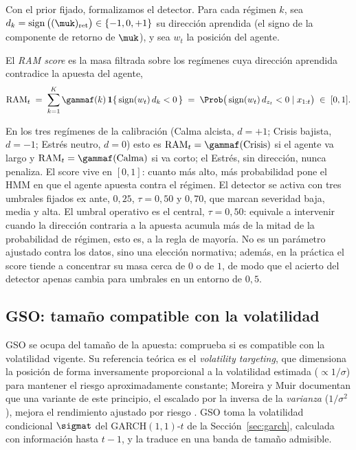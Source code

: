 Con el prior fijado, formalizamos el detector. Para cada régimen $k$, sea $d_k = \operatorname{sign}\big((\muk)_{\mathrm{ret}}\big) \in \{-1, 0, +1\}$ su dirección aprendida (el signo de la componente de retorno de $\muk$), y sea $w_t$ la posición del agente.

\begin{definicion}
\label{def:ram}
El \emph{RAM score} es la masa filtrada sobre los regímenes cuya dirección aprendida contradice la apuesta del agente,
\[
\mathrm{RAM}_t \;=\; \sum_{k=1}^{K} \gammaf(k)\, \mathbf{1}\{\, \operatorname{sign}(w_t)\, d_k < 0 \,\} \;=\; \Prob\big(\operatorname{sign}(w_t)\, d_{z_t} < 0 \mid x_{1:t}\big) \;\in\; [0,1].
\]
\end{definicion}

En los tres regímenes de la calibración (Calma alcista, $d=+1$; Crisis bajista, $d=-1$; Estrés neutro, $d=0$) esto es $\mathrm{RAM}_t = \gammaf(\text{Crisis})$ si el agente va largo y $\mathrm{RAM}_t = \gammaf(\text{Calma})$ si va corto; el Estrés, sin dirección, nunca penaliza. El score vive en $[0,1]$: cuanto más alto, más probabilidad pone el HMM en que el agente apuesta contra el régimen. El detector se activa con tres umbrales fijados ex ante, $0{,}25$, $\tau = 0{,}50$ y $0{,}70$, que marcan severidad baja, media y alta. El umbral operativo es el central, $\tau = 0{,}50$: equivale a intervenir cuando la dirección contraria a la apuesta acumula más de la mitad de la probabilidad de régimen, esto es, a la regla de mayoría. No es un parámetro ajustado contra los datos, sino una elección normativa; además, en la práctica el score tiende a concentrar su masa cerca de $0$ o de $1$, de modo que el acierto del detector apenas cambia para umbrales en un entorno de $0{,}5$.

\subsection{GSO: tamaño compatible con la volatilidad}
\label{sec:strata-gso}

GSO se ocupa del tamaño de la apuesta: comprueba si es compatible con la volatilidad vigente. Su referencia teórica es el \emph{volatility targeting}, que dimensiona la posición de forma inversamente proporcional a la volatilidad estimada ($\propto 1/\sigma$) para mantener el riesgo aproximadamente constante; Moreira y Muir documentan que una variante de este principio, el escalado por la inversa de la \emph{varianza} ($1/\sigma^2$), mejora el rendimiento ajustado por riesgo \cite{moreira2017}. GSO toma la volatilidad condicional $\sigmat$ del GARCH$(1,1)$-$t$ de la Sección~\ref{sec:garch}, calculada con información hasta $t-1$, y la traduce en una banda de tamaño admisible.

